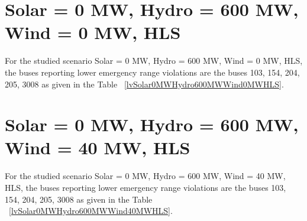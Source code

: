 \documentclass[10pt]{report}
\begin{document}
\section{Solar = 0 MW, Hydro = 600 MW, Wind = 0 MW, HLS}
For the studied scenario Solar = 0 MW, Hydro = 600 MW, Wind = 0 MW, HLS, the buses reporting lower emergency range violations are the buses 103, 154, 204, 205, 3008 as given in the Table ~\ref{lvSolar0MWHydro600MWWind0MWHLS}.
\begin{table}[H]
\caption{Contingencies reporting bus voltages lower than emergency voltage of 1.1 PU for scenario Solar = 0 MW, Hydro = 600 MW, Wind = 0 MW, HLS}
\label{lvSolar0MWHydro600MWWind0MWHLS}
\centering
{}
\end{table}

\section{Solar = 0 MW, Hydro = 600 MW, Wind = 40 MW, HLS}
For the studied scenario Solar = 0 MW, Hydro = 600 MW, Wind = 40 MW, HLS, the buses reporting lower emergency range violations are the buses 103, 154, 204, 205, 3008 as given in the Table ~\ref{lvSolar0MWHydro600MWWind40MWHLS}.
\begin{table}[H]
\caption{Contingencies reporting bus voltages lower than emergency voltage of 1.1 PU for scenario Solar = 0 MW, Hydro = 600 MW, Wind = 40 MW, HLS}
\label{lvSolar0MWHydro600MWWind40MWHLS}
\centering
{}
\end{table}
\end{document}
